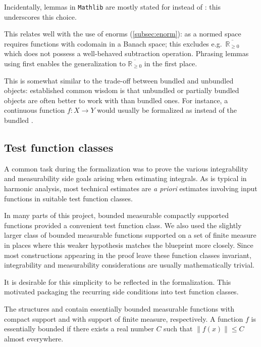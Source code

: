 \documentclass[12pt]{amsart}
\newcommand*{\real}{\mathbb{R}} %
\newcommand{\ennreal}{\overline{\real_{\ge0}}}
\newcommand{\mathlib}{\texttt{Mathlib}\xspace}
\theoremstyle{definition}
\theoremstyle{plain}
\begin{document}
Incidentally, lemmas in \mathlib are mostly stated for  instead of : this underscores this choice.

This relates well with the use of enorms (\ref{subsec:enorm}):  as a normed space requires functions with codomain in a Banach space; this excludes e.g.\ $\ennreal$ which does not possess a well-behaved subtraction operation. Phrasing lemmas using  first enables the generalization to $\ennreal$ in the first place.

This is somewhat similar to the trade-off between bundled and unbundled objects: established common wisdom is that unbundled or partially bundled objects are often better to work with than bundled ones. For instance, a continuous function $f\colon X \to Y$ would usually be formalized as  instead of the bundled .

\subsection{Test function classes}\label{subsec:bdd_comp_supp}
A common task during the formalization was to prove the various integrability and measurability side goals
arising when estimating integrals.
As is typical in harmonic analysis, most technical estimates are {\it a priori} estimates involving
input functions in suitable test function classes.

In many parts of this project, bounded measurable compactly supported functions provided a convenient
test function class. We also used the slightly larger class
of bounded measurable functions supported on a set of finite measure in places where this weaker hypothesis
matches the blueprint more closely.
Since most constructions appearing in the proof leave these function classes invariant,
integrability and measurability considerations are usually mathematically trivial.

It is desirable for this simplicity to be reflected in the formalization.
This motivated packaging the recurring side conditions into test function classes.

The structures  and  contain essentially bounded measurable functions with compact support and with support of finite measure, respectively. A function $f$ is essentially bounded if there exists a real number $C$ such that $\|f(x)\|\le C$ almost everywhere.
\end{document}
